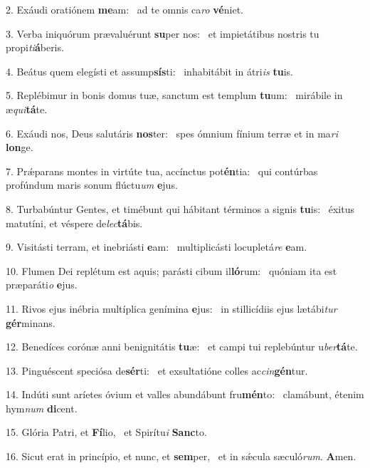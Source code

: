 2. Exáudi oratiónem \textbf{me}am: \ast\  ad te omnis ca\textit{ro} \textbf{vé}niet.\

3. Verba iniquórum prævaluérunt \textbf{su}per nos: \ast\  et impietátibus nostris tu propi\textit{ti}\textbf{á}beris.\

4. Beátus quem elegísti et assump\textbf{sís}ti: \ast\  inhabitábit in átri\textit{is} \textbf{tu}is.\

5. Replébimur in bonis domus tuæ, sanctum est templum \textbf{tu}um: \ast\  mirábile in æ\textit{qui}\textbf{tá}te.\

6. Exáudi nos, Deus salutáris \textbf{nos}ter: \ast\  spes ómnium fínium terræ et in ma\textit{ri} \textbf{lon}ge.\

7. Prǽparans montes in virtúte tua, accínctus pot\textbf{én}tia: \ast\  qui contúrbas profúndum maris sonum flúctu\textit{um} \textbf{e}jus.\

8. Turbabúntur Gentes, et timébunt qui hábitant términos a signis \textbf{tu}is: \ast\  éxitus matutíni, et véspere de\textit{lec}\textbf{tá}bis.\

9. Visitásti terram, et inebriásti \textbf{e}am: \ast\  multiplicásti locupletá\textit{re} \textbf{e}am.\

10. Flumen Dei replétum est aquis; parásti cibum il\textbf{ló}rum: \ast\  quóniam ita est præparáti\textit{o} \textbf{e}jus.\

11. Rivos ejus inébria multíplica genímina \textbf{e}jus: \ast\  in stillicídiis ejus lætábi\textit{tur} \textbf{gér}minans.\

12. Benedíces corónæ anni benignitátis \textbf{tu}æ: \ast\  et campi tui replebúntur u\textit{ber}\textbf{tá}te.\

13. Pinguéscent speciósa de\textbf{sér}ti: \ast\  et exsultatióne colles ac\textit{cin}\textbf{gén}tur.\

14. Indúti sunt aríetes óvium et valles abundábunt fru\textbf{mén}to: \ast\  clamábunt, étenim hym\textit{num} \textbf{di}cent.\

15. Glória Patri, et \textbf{Fí}lio, \ast\  et Spirítu\textit{i} \textbf{Sanc}to.\

16. Sicut erat in princípio, et nunc, et \textbf{sem}per, \ast\  et in sǽcula sæculó\textit{rum}. \textbf{A}men.\

